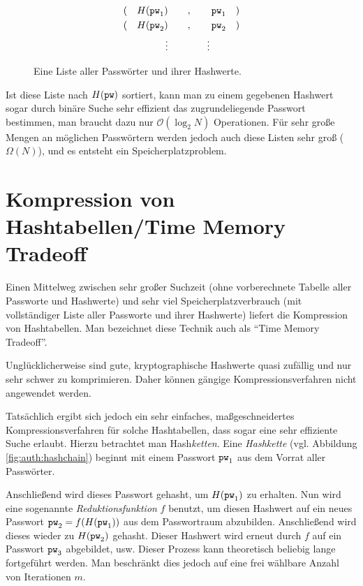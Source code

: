 \begin{figure}[h]
  \begin{align*}
    (\quad H(\texttt{pw}_1) \qquad&,\qquad \texttt{pw}_1 \quad) \\
    (\quad H(\texttt{pw}_2) \qquad&,\qquad \texttt{pw}_2 \quad) \\ 
    \vdots \qquad&\qquad \vdots
  \end{align*}
  \caption{Eine Liste aller Passwörter und ihrer Hashwerte.}
  \label{fig:auth:listofhashes}
\end{figure}

Ist diese Liste nach $H(\texttt{pw})$ sortiert, kann man zu einem gegebenen
Hashwert sogar durch binäre Suche sehr effizient das zugrundeliegende
Passwort bestimmen, man braucht dazu nur $\mathcal{O}(\log_2 N)$
Operationen. Für sehr große Mengen an möglichen Passwörtern werden
jedoch auch diese Listen sehr groß ($\Omega(N)$), und es entsteht ein
Speicherplatzproblem.

\section{Kompression von Hashtabellen/Time Memory Tradeoff}
Einen Mittelweg zwischen sehr großer Suchzeit (ohne vorberechnete
Tabelle aller Passworte und Hashwerte) und sehr viel
Speicherplatzverbrauch (mit vollständiger Liste aller Passworte und
ihrer Hashwerte) liefert die Kompression von Hashtabellen. Man
bezeichnet diese Technik auch als "`Time Memory Tradeoff"'.

Unglücklicherweise sind gute, kryptographische Hashwerte quasi zufällig
und nur sehr schwer zu komprimieren. Daher können gängige
Kompressionsverfahren nicht angewendet werden.

Tatsächlich ergibt sich jedoch ein sehr einfaches, maßgeschneidertes
Kompressionsverfahren für solche Hashtabellen, dass sogar eine sehr
effiziente Suche erlaubt.  Hierzu betrachtet man Hash\emph{ketten}.
Eine \emph{Hashkette} (vgl. Abbildung
\ref{fig:auth:hashchain}) beginnt mit einem Passwort $\texttt{pw}_1$ aus dem
Vorrat aller Passwörter.

Anschließend wird dieses Passwort gehasht, um $H(\texttt{pw}_1)$ zu erhalten.
Nun wird eine sogenannte \emph{Reduktionsfunktion} $f$ benutzt, um
diesen Hashwert auf ein neues Passwort $\texttt{pw}_2 = f(H(\texttt{pw}_1))$ aus dem
Passwortraum abzubilden.  Anschließend wird dieses wieder zu $H(\texttt{pw}_2)$
gehasht.  Dieser Hashwert wird erneut durch $f$ auf ein Passwort $\texttt{pw}_3$
abgebildet, usw.  Dieser Prozess kann theoretisch beliebig lange
fortgeführt werden. Man beschränkt dies jedoch auf eine frei wählbare
Anzahl von Iterationen $m$.

